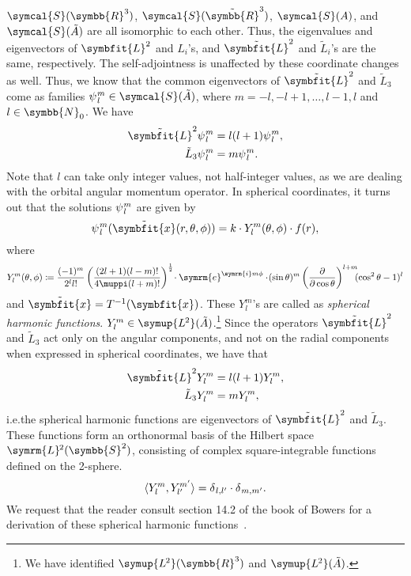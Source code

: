 \documentclass[12pt, a4 paper]{article}
\theoremstyle{definition}
\newcommand{\ltwo}{\symup{L\kern-0.5pt^2}}
\newcommand{\ltworthree}{\ltwo(\rr^3)}
\newcommand{\rr}{\symbb{R}}
\newcommand{\nn}{\symbb{N}_0}
\newcommand{\schwartz}{\symcal{S}}
\newcommand{\schwartzrthree}{\schwartz(\rr^3)}
\renewcommand{\i}{\symrm{i}}
\newcommand{\e}{\symrm{e}}
\renewcommand{\pi}{\muppi}
\newcommand{\lvecsquare}{\tilde{\symbfit{L}}^2}
\newcommand{\ltwoa}{\ltwo(\tilde{A})}
\newcommand{\sphe}{Y_l^m}
\begin{document}
    \(\schwartzrthree\), \(\schwartz(\tilde{\rr}^3)\), \(\schwartz(A)\), and \(\schwartz(\tilde{A})\) are all isomorphic to each other. Thus, the eigenvalues and eigenvectors of \(\symbfit{L}^2\) and \(L_i\)'s, and \(\lvecsquare\) and \(\tilde{L}_i\)'s are the same, respectively. The self-adjointness is unaffected by these coordinate changes as well. Thus, we know that the common eigenvectors of $\lvecsquare$ and $\tilde{L}_3$ come as families $\psi\kern0.5pt_l^m \in \schwartz(\tilde{A})$, where $m = -l, -l+1, \ldots, l-1, l$ and $l \in \nn$. We have
    \begin{align*}
        \lvecsquare \psi\kern0.5pt_l^m &= l(l+1)\psi\kern0.5pt_l^m,\\
        \tilde{L}_3 \psi\kern0.5pt_l^m &= m \psi\kern0.5pt_l^m.
    \end{align*}
    Note that $l$ can take only integer values, not half-integer values, as we are dealing with the orbital angular momentum operator. In spherical coordinates, it turns out that the solutions $\psi\kern0.5pt_l^m$ are given by
    \[
        \psi\kern0.5pt_l^m (\tilde{\symbfit{x}} (r, \theta, \phi)) = k \cdot Y^m_l (\theta, \phi) \cdot f(r),
    \]
    where
    \[
        Y^m_l (\theta, \phi) \coloneq \frac{(-1)^m}{2^l l!}\left(\frac{(2l+1) (l-m)!}{4\pi (l+m)!}\right)^{\frac{1}{2}}\!\cdot\e^{\i m\phi}\cdot\!(\sin{\theta})^m \left(\frac{\partial}{\partial \cos{\theta}}\right)^{l+m}\!\!\!(\cos^2{\theta} -1)^l
    \]
    and $\tilde{\symbfit{x}} = T^{-1}(\symbfit{x})$. These $\sphe$'s are called as \textit{spherical harmonic functions}. \(\sphe \in \ltwoa\).\footnote{We have identified \(\ltworthree\) and \(\ltwoa\).} Since the operators $\lvecsquare$ and $\tilde{L}_3$ act only on the angular components, and not on the radial components when expressed in spherical coordinates, we have that
    \begin{align*}
        \lvecsquare \sphe &= l(l+1) \sphe,\\
        \tilde{L}_3 \sphe &= m \sphe,
    \end{align*}
    i.e.\@ the spherical harmonic functions are eigenvectors of $\lvecsquare$ and $\tilde{L}_3$. These functions form an orthonormal basis of the Hilbert space $\symrm{L}\kern-0.7pt^2(\symbb{S}^2)$, consisting of complex square-integrable functions defined on the 2-sphere.
    \[
        \langle \sphe , Y_{l'}^{m'} \rangle = \delta\kern0.5pt_{l, l'}\cdot\delta\kern0.4pt_{m, m'}.
    \]
    We request that the reader consult section 14.2 of the book of Bowers for a derivation of these spherical harmonic functions~\cite[p.~200]{Bowers}.
\end{document}
